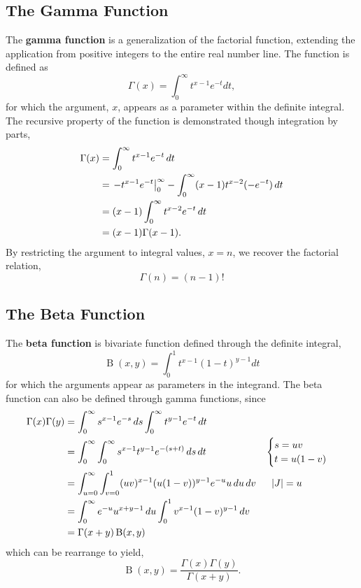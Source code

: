 \documentclass[12pt, twoside, draft]{article}
\begin{document}
\subsection {The Gamma Function}\label{sec:gamma_function}
The \textbf{gamma function} is a generalization of the factorial function, extending the application from positive integers to the entire real number line.  The function is defined as
\begin{equation}\label{eq:gamma_function}
\Gamma(x) = \int_0^\infty t^{x-1} e^{-t} dt,
\end{equation}
for which the argument, $x$, appears as a parameter within the definite integral.  The recursive property of the function is demonstrated though integration by parts,
\begin{align}
\Gamma(x) &= \int_0^\infty t^{x-1} e^{-t}\, dt \notag \\
&= \left. -t^{x-1}e^{-t} \right|_0^\infty - \int_0^\infty (x-1)t^{x-2}(-e^{-t}) \,dt \notag \\
&= (x-1) \int_0^\infty t^{x-2} e^{-t} \,dt \notag \\
&= (x-1) \Gamma(x-1).
\end{align}
By restricting the argument to integral values, $x = n$, we recover the factorial relation,
\begin{equation}
\Gamma(n) = (n-1)!
\end{equation}

\subsection {The Beta Function}\label{sec:beta_function}
The \textbf{beta function} is bivariate function defined through the definite integral,
\begin{equation}\label{eq:beta_function}
\operatorname{B}(x,y) = \int_0^1 t^{x-1} (1-t)^{y-1} dt
\end{equation}
for which the arguments appear as parameters in the integrand.  The beta function can also be defined through gamma functions, since
\begin{align}
\Gamma(x) \Gamma(y) &= \int_0^\infty s^{x-1}e^{-s} \,ds \int_0^\infty t^{y-1}e^{-t}\,dt \notag \\
&= \int_0^\infty \int_0^\infty s^{x-1} t^{y-1} e^{-(s+t)}\, ds \, dt  \hspace{60pt}
\begin{cases}
s = uv \\
t = u(1-v)
\end{cases}
\notag \\
&= \int_{u=0}^\infty \int_{v=0}^1 (uv)^{x-1} (u(1-v))^{y-1} e^{-u} u \,du \, dv  \hspace{16pt} |J| = u \notag \\
&= \int_0^\infty e^{-u} u^{x+y-1} \,du \int_0^1 v^{x-1} (1-v)^{y-1} \,dv \notag \\
&= \Gamma(x+y) \operatorname{B}(x,y)
\end{align}
which can be rearrange to yield,
\begin{equation}\label{eq:beta_gamma_function}
\operatorname{B}(x,y) = \frac{\Gamma(x) \Gamma(y)}{\Gamma(x+y)}.
\end{equation}
\end{document}
